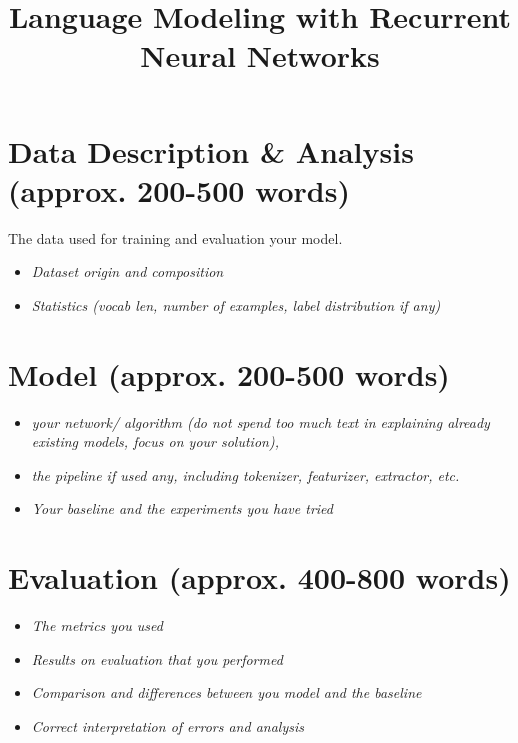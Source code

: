 \documentclass[a4paper]{article}
\title{Language Modeling with Recurrent Neural Networks}
\begin{document}
\maketitle





\section{Data Description \& Analysis (approx. 200-500 words)}
The data used for training and evaluation your model.
\begin{itemize}
    \item \textit{Dataset origin and composition}
    \item \textit{Statistics (vocab len, number of examples, label distribution if any)}
\end{itemize}
\section{Model (approx. 200-500 words)}
\begin{itemize}
    \item \textit{your network/ algorithm (do not spend too much text in explaining already existing models, focus on your solution),}
    \item \textit{the pipeline if used any, including  tokenizer, featurizer, extractor, etc.}
    \item \textit{Your baseline and the experiments you have tried}
\end{itemize}
 

\section{Evaluation (approx. 400-800 words)}

\begin{itemize}
    \item \textit{The metrics you used}
    \item \textit{Results on evaluation that you performed}
    \item \textit{Comparison and differences between you model and the baseline}
    \item \textit{Correct interpretation of errors and analysis}
\end{itemize}
\end{document}
